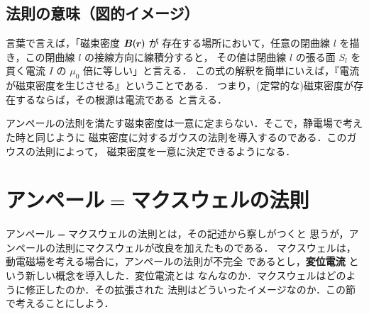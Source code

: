     \subsection{法則の意味（図的イメージ）}
        言葉で言えば，「磁束密度 $\boldsymbol{B}(\boldsymbol{r})$ が
        存在する場所において，任意の閉曲線 $l$ を描き，この閉曲線 $l$ の接線方向に線積分すると，
        その値は閉曲線 $l$ の張る面 $S_{l}$ を貫く電流 $I$ の $\mu_{0}$ 倍に等しい」と言える．
        この式の解釈を簡単にいえば，『電流が磁束密度を生じさせる』ということである．
        つまり，(定常的な)磁束密度が存在するならば，その根源は電流である と言える．

        アンペールの法則を満たす磁束密度は一意に定まらない．そこで，静電場で考えた時と同じように
        磁束密度に対するガウスの法則を導入するのである．このガウスの法則によって，
        磁束密度を一意に決定できるようになる．

    \section{アンペール$=$マクスウェルの法則}
    \begin{mycomment}
        アンペール$=$マクスウェルの法則とは，その記述から察しがつくと
        思うが，アンペールの法則にマクスウェルが改良を加えたものである．
        マクスウェルは，動電磁場を考える場合に，アンペールの法則が不完全
        であるとし，\textbf{変位電流} という新しい概念を導入した．変位電流とは
        なんなのか．マクスウェルはどのように修正したのか．その拡張された
        法則はどういったイメージなのか．この節で考えることにしよう．
    \end{mycomment}

